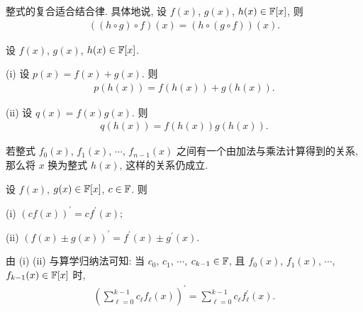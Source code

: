\begin{proposition}
    整式的复合适合结合律. 具体地说, 设 $f(x)$, $g(x)$, $h(x) \in \mathbb{F}[x]$, 则
    \begin{align*}
        ((h \circ g) \circ f)(x) = (h \circ (g \circ f))(x).
    \end{align*}
\end{proposition}

\begin{proposition}
    设 $f(x)$, $g(x)$, $h(x) \in \mathbb{F}[x]$.

    (i) 设 $p(x) = f(x) + g(x)$. 则
    \begin{align*}
        p(h(x)) = f(h(x)) + g(h(x)).
    \end{align*}

    (ii) 设 $q(x) = f(x) g(x)$. 则
    \begin{align*}
        q(h(x)) = f(h(x)) g(h(x)).
    \end{align*}
\end{proposition}

\begin{proposition}
    若整式 $f_0 (x)$, $f_1 (x)$, $\cdots$, $f_{n-1} (x)$ 之间有一个由加法与乘法计算得到的关系, 那么将 $x$ 换为整式 $h(x)$, 这样的关系仍成立.
\end{proposition}

\begin{proposition}
    设 $f(x)$, $g(x) \in \mathbb{F}[x]$, $c \in \mathbb{F}$. 则

    (i) $(cf(x))^{\prime} = c f^{\prime} (x)$;

    (ii) $(f(x) \pm g(x))^{\prime} = f^{\prime} (x) \pm g^{\prime} (x)$.

    由 (i) (ii) 与算学归纳法可知: 当 $c_0$, $c_1$, $\cdots$, $c_{k-1} \in \mathbb{F}$, 且 $f_0 (x)$, $f_1 (x)$, $\cdots$, $f_{k-1} (x) \in \mathbb{F}[x]$ 时,
    \begin{align*}
        \left( \sum_{\ell = 0}^{k-1} c_\ell f_\ell (x) \right)^{\prime} = \sum_{\ell = 0}^{k-1} c_\ell f_\ell^{\prime} (x).
    \end{align*}
\end{proposition}

